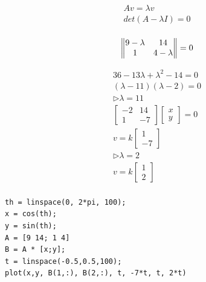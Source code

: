 \documentclass[12pt,a4paper]{article}
\begin{document}
\begin{gather*}
Av = \lambda v\\
det(A-\lambda I) = 0\\
\end{gather*}

\begin{equation*}
	\begin{Vmatrix}
	9-\lambda&14\\1&4-\lambda
	\end{Vmatrix}=0\\
\end{equation*}
	
\begin{gather*}
36 -13\lambda + \lambda^2 -14 = 0\\
(\lambda-11)(\lambda-2)=0\\
\rhd \lambda=11\\
\begin{bmatrix}
-2&14\\1&-7
\end{bmatrix}
\begin{bmatrix}
x\\y
\end{bmatrix}=0\\
v = k
\begin{bmatrix}
1 \\-7
\end{bmatrix}\\
\rhd \lambda=2\\
v=k
\begin{bmatrix}
1\\2
\end{bmatrix}\\
\end{gather*}
\begin{lstlisting}
th = linspace(0, 2*pi, 100);
x = cos(th);
y = sin(th);
A = [9 14; 1 4]
B = A * [x;y];
t = linspace(-0.5,0.5,100);
plot(x,y, B(1,:), B(2,:), t, -7*t, t, 2*t)
\end{lstlisting}
\end{document}
